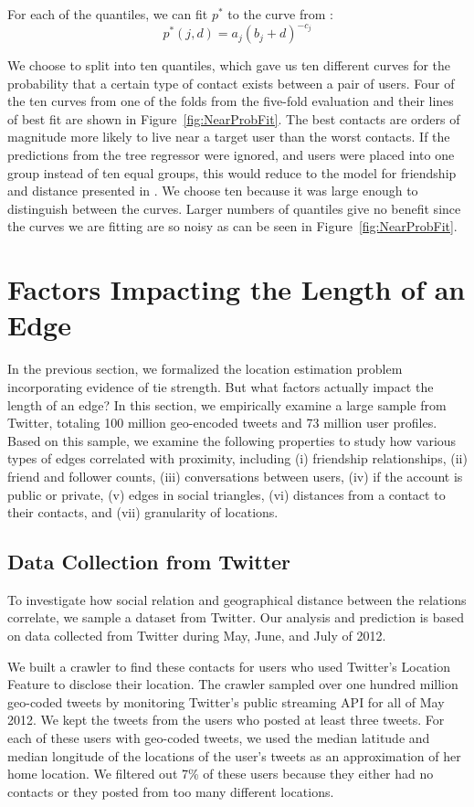 \documentclass[letterpaper]{article}
\begin{document}
For each of the quantiles, we can fit $p^*$ to the curve from \cite{backstrom2010find}:
\[
    p^*(j,d) = a_{j} (b_{j}+d)^{-c_{j}}
\]

We choose to split into ten quantiles, which gave us ten different curves for the probability that a certain type of contact exists between a pair of users.  Four of the ten curves from one of the folds from the five-fold evaluation and their lines of best fit are shown in Figure~\ref{fig:NearProbFit}. The best contacts are orders of magnitude more likely to live near a target user than the worst contacts. If the predictions from the tree regressor were ignored, and users were placed into one group instead of ten equal groups, this would reduce to the model for friendship and distance presented in \cite{backstrom2010find}. We choose ten because it was large enough to distinguish between the curves.  Larger numbers of quantiles give no benefit since the curves we are fitting are so noisy as can be seen in Figure~\ref{fig:NearProbFit}.


\section{Factors Impacting the Length of an Edge}
In the previous section, we formalized the location estimation problem incorporating evidence of tie strength. But what factors actually impact the length of an edge? In this section, we empirically examine a large sample from Twitter, totaling 100 million geo-encoded tweets and 73 million user profiles.
%
Based on this sample, we examine the following properties to study how various
types of edges correlated with proximity, including
    (i) friendship relationships,
    (ii) friend and follower counts,
    (iii) conversations between users,
    (iv) if the account is public or private,
    (v) edges in social triangles,
    (vi) distances from a contact to their contacts, and
    (vii) granularity of locations.

\subsection{Data Collection from Twitter}
To investigate how social relation and geographical distance between the
relations correlate, we sample a dataset from Twitter.
%
Our analysis and prediction is based on data collected from Twitter during
May, June, and July of 2012.

We built a crawler to find these contacts for users who used Twitter's Location
Feature to disclose their location.
%
The crawler sampled over one hundred million geo-coded tweets by monitoring
Twitter's public streaming API for all of May 2012.
We kept the tweets from the users who posted at least three tweets.
%
For each of these users with geo-coded tweets, we used the median latitude and
median longitude of the locations of the user's tweets as an approximation of
her home location.
%
We filtered out 7\% of these users because they either had no contacts or they
posted from too many different locations.
\end{document}
